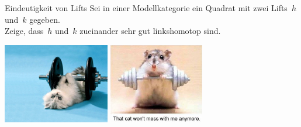 \documentclass{uebblatt}
\begin{document}
\begin{aufgabe}{Eindeutigkeit von Lifts}
Sei in einer Modellkategorie ein Quadrat mit zwei Lifts~$h$ und~$k$ gegeben. \\
Zeige, dass~$h$ und~$k$ zueinander sehr gut linkshomotop sind.
\end{aufgabe}

\vfill
\centering
\href{http://fashions-cloud.com/pages/c/cat-lifting-weights/}{\includegraphics[height=3.5cm]{images/lifting-property-1}}
\qquad
\href{http://www.woophotos.com/weight-lifter/}{\includegraphics[height=3.5cm]{images/lifting-property-2}}
\par
\end{document}
